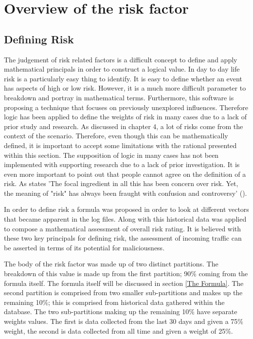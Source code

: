 \section{Overview of the risk factor}
\subsection{Defining Risk} \label{Define Risk}
The judgement of risk related factors is a difficult concept to define and apply mathematical principals in order to construct a logical value. In day to day life risk is a particularly easy thing to identify. It is easy to define whether an event has aspects of high or low risk. However, it is a much more difficult parameter to breakdown and portray in mathematical terms. Furthermore, this software is proposing a technique that focuses on previously unexplored influences. Therefore logic has been applied to define the weights of risk in many cases due to a lack of prior study and research. As discussed in chapter 4, a lot of risks come from the context of the scenario. Therefore, even though this can be mathematically defined, it is important to accept some limitations with the rational presented within this section. The supposition of logic in many cases has not been implemented with supporting research due to a lack of prior investigation. It is even more important to point out that people cannot agree on the definition of a risk. As \citeauthor{fischhoff1984defining} states 'The focal ingredient in all this has been concern over risk. Yet, the meaning of "risk" has always been fraught with confusion and controversy' (\cite{fischhoff1984defining}).

In order to define risk a formula was proposed in order to look at different vectors that became apparent in the log files. Along with this historical data was applied to compose a mathematical assessment of overall risk rating. It is believed with these two key principals for defining risk, the assessment of incoming traffic can be asserted in terms of its potential for maliciousness.

The body of the risk factor was made up of two distinct partitions. The breakdown of this value is made up from the first partition; 90\% coming from the formula itself. The formula itself will be discussed in section \ref{The Formula}. The second partition is comprised from two smaller sub-partitions and makes up the remaining 10\%; this is comprised from historical data gathered within the database. The two sub-partitions making up the remaining 10\%  have separate weights values. The first is data collected from the last 30 days and given a 75\% weight, the second is data collected from all time and given a weight of 25\%.

